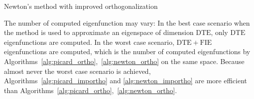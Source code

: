 \documentclass[smallextended]{svjour3}
\begin{document}
\begin{algorithm}[!ht] \caption{Newton's method with improved orthogonalization} \label{alg:newton_importho} 
\begin{algorithmic}

\REPEAT
{}
    \ENDFOR
    \ENDIF
\ENDIF



\end{algorithmic}
\end{algorithm}
\noindent
The number of computed eigenfunction may vary: In the best case scenario when the method is used to approximate an eigenspace of dimension $\mathrm{DTE}$, only $\mathrm{DTE}$ eigenfunctions are computed. In the worst case scenario, $\mathrm{DTE}+\mathrm{FIE}$ eigenfunctions are computed, which is the number of computed eigenfunctions by Algorithms~\ref{alg:picard_ortho},~\ref{alg:newton_ortho} on the same space. Because almost never the worst case scenario is achieved, Algorithms~\ref{alg:picard_importho} and \ref{alg:newton_importho} are more efficient than Algorithms~\ref{alg:picard_ortho},~\ref{alg:newton_ortho}.
\end{document}
